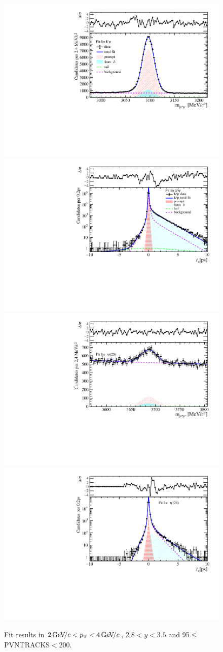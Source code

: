 \begin{figure}[H]
\begin{center}
\includegraphics[width=0.47\linewidth]{pdf/Jpsi/drawmass/n5y2pt2.pdf}
\includegraphics[width=0.47\linewidth]{pdf/Jpsi/2DFit/n5y2pt2.pdf}
\vspace*{-0.5cm}
\includegraphics[width=0.47\linewidth]{pdf/Psi2S/drawmass/n5y2pt2.pdf}
\includegraphics[width=0.47\linewidth]{pdf/Psi2S/2DFit/n5y2pt2.pdf}
\vspace*{-0.5cm}
\end{center}
\caption{Fit results in $2\text{\,Ge\kern -0.1em V\!/}c<p_{\mathrm{T}}<4\text{\,Ge\kern -0.1em V\!/}c$, $2.8<y<3.5$ and 95$\leq$PVNTRACKS$<$200.}
\label{Fitn5y2pt2}
\end{figure}
